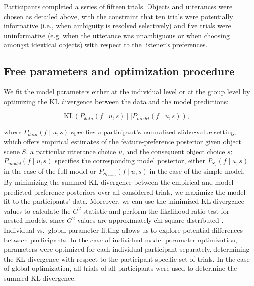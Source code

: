 \documentclass[11pt,a4paper]{article}
\newcommand{\gcs}[1]{\textcolor{blue}{[gcs: #1]}}
\begin{document}
Participants completed a series of fifteen trials. Objects and utterances were chosen as detailed above, with the constraint that ten trials were potentially informative (i.e., when ambiguity is resolved selectively) and five trials were uninformative (e.g. when the utterance was unambiguous or when choosing amongst identical objects) with respect to the listener's preferences. 

\subsection{Free parameters and optimization procedure}



We fit the model parameters either at the individual level or at the group level by optimizing the KL divergence between the data and the model predictions:

\begin{equation}
	\textrm{KL}(P_{data}(f \mid u,s)\mid\mid P_{model}(f\mid u,s)),
\end{equation}

\noindent where $P_{data}(f\mid u,s)$ specifies a participant's normalized slider-value setting, which offers empirical estimates of the feature-preference posterior given object scene $S$, a particular utterance choice $u$, and the consequent object choice $s$;
$P_{model}(f\mid u,s)$ specifies the corresponding model posterior, either $P_{S_{2}}(f\mid u,s)$ in the case of the full model or $P_{S_{1\textrm{-simp}}}(f\mid u,s)$ in the case of the simple model. 
By minimizing the summed KL divergence between the empirical and model-predicted preference posteriors over all considered trials, we maximize the model fit to the participants' data. 
Moreover, we can use the minimized KL divergence values to calculate the $G^2$-statistic and perform the likelihood-ratio test for nested models, since $G^2$ values are approximately chi-square distributed \cite{Lewandowsky:2011}. 
Individual vs.~global parameter fitting allows us to explore potential differences between participants.
In the case of individual model parameter optimization, parameters were optimized for each individual participant separately, determining the KL divergence with respect to the participant-specific set of trials. 
In the case of global optimization, all trials of all participants were used to determine the summed KL divergence.
\end{document}
